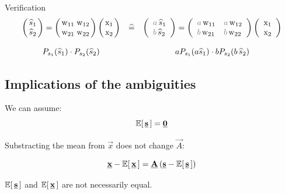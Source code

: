 \begin{frame}{Verification}
{\footnotesize
\begin{equation}
	\begin{array}{ccc}
	\arraycolsep=1.4pt
	\left( \begin{array}{ll}
		\widehat{s}_1 \\ \widehat{s}_2
	\end{array} \right)
	=
	\left( \begin{array}{ll}
		\mathrm{w}_{11} & \mathrm{w}_{12} \\
		\mathrm{w}_{21} & \mathrm{w}_{22} 
	\end{array} \right)
	\left( \begin{array}{ll}
		\mathrm{x}_1 \\ \mathrm{x}_2
	\end{array} \right)
	& \corresponds &
	\left( \begin{array}{ll}
		\textcolor{gray}{a}\,\widehat{s}_1 \\ 
                 \textcolor{gray}{b}\,\widehat{s}_2
	\end{array} \right)
	=
	\left( \begin{array}{ll}
		\textcolor{gray}{a}\,\mathrm{w}_{11} & \textcolor{gray}{a}\,\mathrm{w}_{12} \\
		\textcolor{gray}{b}\,\mathrm{w}_{21} & \textcolor{gray}{b}\,\mathrm{w}_{22} 
	\end{array} \right)
	\left( \begin{array}{ll}
		\mathrm{x}_1 \\ \mathrm{x}_2
	\end{array} \right)
	\\\\
	P_{s_1} (\widehat{s}_1) \cdot P_{s_2} (\widehat{s}_2)
	&& 
	aP_{s_1} (a\widehat{s}_1) \cdot bP_{s_2} (b\, \widehat{s}_2)
	\end{array}
\end{equation}
}
\end{frame}

\subsection{Implications of the ambiguities}

\begin{frame}{\subsecname}

We can assume:
\begin{equation}
\mathbb{E} \lbrack \, \underline{\mathbf{s}} \, \rbrack = \underline{\mathbf{0}}
\end{equation}

Substracting the mean from $\vec x$ does not change $\vec A$:

\begin{equation}
\underline{\mathbf{x}} - \mathbb{E} \lbrack \, \underline{\mathbf{x}} \, \rbrack = \underline{\mathbf{A}} \left( \underline{\mathbf{s}} - \mathbb{E} \lbrack \, \underline{\mathbf{s}} \, \rbrack \right)
\end{equation}

 $\mathbb{E} \lbrack \, \underline{\mathbf{s}} \, \rbrack$ and $\mathbb{E} \lbrack \, \underline{\mathbf{x}} \, \rbrack$ are not necessarily equal.

\end{frame}

